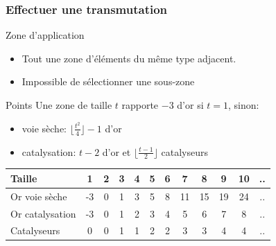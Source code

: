 \documentclass{beamer}
\begin{document}
\begin{frame}
    \frametitle{Effectuer une transmutation}

    \begin{block}{Zone d'application}
        \begin{itemize}
            \item Tout une zone d'éléments du même type adjacent.
            \item Impossible de sélectionner une sous-zone
        \end{itemize}
    \end{block}
    \begin{block}{Points}
        Une zone de taille $t$ rapporte $-3$ d'or si $t = 1$, sinon:
        \begin{itemize}
            \item voie sèche: $\lfloor \frac{t^2}4 \rfloor - 1$ d'or
            \item catalysation: $t - 2$ d'or et
                $\lfloor \frac{t-1}2 \rfloor$ catalyseurs
        \end{itemize}
        \begin{tabular}{l|c|c|c|c|c|c|c|c|c|c|c}
            Taille & 1 & 2 & 3 & 4 & 5 & 6 & 7 & 8 & 9 & 10 & ..\\
            \hline
            Or voie sèche   & -3 & 0 & 1 & 3 & 5 & 8 & 11 & 15 & 19 & 24 & ..\\
            \hline
            Or catalysation & -3 & 0 & 1 & 2 & 3 & 4 & 5  & 6  & 7  & 8  & ..\\
            \hline
            Catalyseurs     & 0  & 0 & 1 & 1 & 2 & 2 & 3  & 3  & 4  & 4  & ..
        \end{tabular}
    \end{block}
\end{frame}
\end{document}
